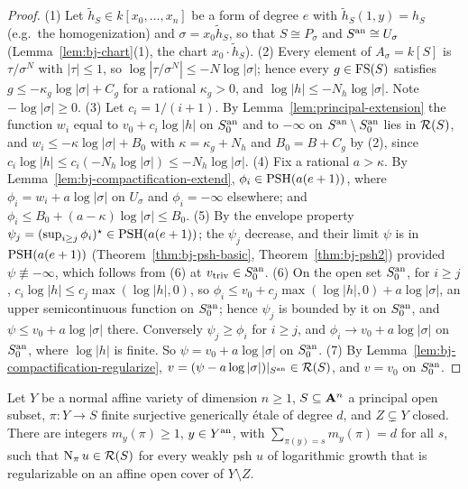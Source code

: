 \begin{proof}
(1) Let $\tilde h_S\in k[x_0,\dots,x_n]$ be a form of degree $e$ with $\tilde h_S(1,y)=h_S$ (e.g.\ the homogenization) and $\sigma=x_0\tilde h_S$, so that
$S\cong P_\sigma$ and $S^{\mathrm{an}}\cong U_\sigma$ (Lemma~\ref{lem:bj-chart}(1), the chart $x_0\cdot\tilde h_S$). (2) Every element of
$A_\sigma=k[S]$ is $\tau/\sigma^N$ with $|\tau|\le1$, so $\log|\tau/\sigma^N|\le-N\log|\sigma|$; hence every $g\in\mathrm{FS}(S)$ satisfies
$g\le-\kappa_g\log|\sigma|+C_g$ for a rational $\kappa_g>0$, and $\log|h|\le-N_h\log|\sigma|$. Note $-\log|\sigma|\ge0$. (3) Let
$c_i=1/(i+1)$. By Lemma~\ref{lem:principal-extension} the function $w_i$ equal to $v_0+c_i\log|h|$ on $S_0^{\mathrm{an}}$ and to $-\infty$
on $S^{\mathrm{an}}\setminus S_0^{\mathrm{an}}$ lies in $\mathcal{R}(S)$, and $w_i\le-\kappa\log|\sigma|+B_0$ with $\kappa=\kappa_g+N_h$ and
$B_0=B+C_g$ by (2), since $c_i\log|h|\le c_i(-N_h\log|\sigma|)\le-N_h\log|\sigma|$. (4) Fix a rational $a>\kappa$. By
Lemma~\ref{lem:bj-compactification-extend}, $\phi_i\in\operatorname{PSH}(a(e+1))$, where $\phi_i=w_i+a\log|\sigma|$ on $U_\sigma$ and
$\phi_i=-\infty$ elsewhere; and $\phi_i\le B_0+(a-\kappa)\log|\sigma|\le B_0$. (5) By the envelope property
$\psi_j=(\sup_{i\ge j}\phi_i)^\star\in\operatorname{PSH}(a(e+1))$; the $\psi_j$ decrease, and their limit $\psi$ is in
$\operatorname{PSH}(a(e+1))$ (Theorem~\ref{thm:bj-psh-basic}, Theorem~\ref{thm:bj-psh2}) provided $\psi\not\equiv-\infty$, which follows
from (6) at $v_{\mathrm{triv}}\in S_0^{\mathrm{an}}$. (6) On the open set $S_0^{\mathrm{an}}$, for $i\ge j$, $c_i\log|h|\le c_j\max(\log|h|,0)$, so
$\phi_i\le v_0+c_j\max(\log|h|,0)+a\log|\sigma|$, an upper semicontinuous function on $S_0^{\mathrm{an}}$; hence $\psi_j$ is bounded by it on
$S_0^{\mathrm{an}}$, and $\psi\le v_0+a\log|\sigma|$ there. Conversely $\psi_j\ge\phi_i$ for $i\ge j$, and $\phi_i\to v_0+a\log|\sigma|$ on
$S_0^{\mathrm{an}}$, where $\log|h|$ is finite. So $\psi=v_0+a\log|\sigma|$ on $S_0^{\mathrm{an}}$. (7) By Lemma~\ref{lem:bj-compactification-regularize},
$v=(\psi-a\log|\sigma|)|_{S^{\mathrm{an}}}\in\mathcal{R}(S)$, and $v=v_0$ on $S_0^{\mathrm{an}}$.
\end{proof}

\begin{proposition}\label{prop:nonflat-norm}
\notready
{}
Let $Y$ be a normal affine variety of dimension $n\ge1$, $S\subseteq\mathbf{A}^n$ a principal open subset,
$\pi\colon Y\to S$ finite surjective generically \'etale of degree $d$, and $Z\subsetneq Y$ closed.
There are integers $m_y(\pi)\ge1$, $y\in Y^{\mathrm{an}}$, with $\sum_{\pi(y)=s}m_y(\pi)=d$ for all $s$, such
that $\operatorname{N}_\pi u\in\mathcal{R}(S)$ for every weakly psh $u$ of logarithmic growth that is regularizable on
an affine open cover of $Y\setminus Z$.
\end{proposition}

